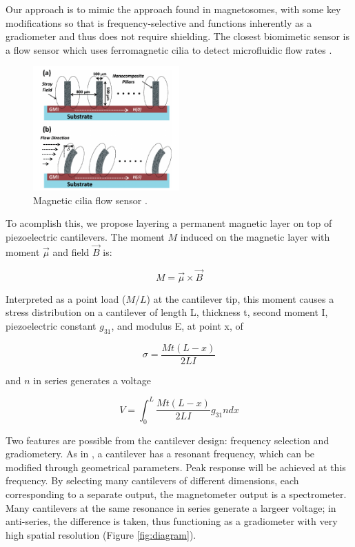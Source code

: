 Our approach is to mimic the approach found in magnetosomes, with some key modifications so that is frequency-selective and functions inherently as a gradiometer and thus does not require shielding. The closest biomimetic sensor is a flow sensor which uses ferromagnetic cilia to detect microfluidic flow rates \cite{alfadhel2014magnetic}.

\begin{figure}[h]
\centering
\includegraphics[width=0.5\textwidth]{cilia}
\caption{Magnetic cilia flow sensor \cite{alfadhel2014magnetic}.}
\label{fig:cilia}
\end{figure}

To acomplish this, we propose layering a permanent magnetic layer on top of piezoelectric cantilevers. The moment $M$ induced on the magnetic layer with moment $\vec{\mu}$ and field $\vec{B}$ is:


$$  M=\vec{\mu} \times \vec{B} $$

Interpreted as a point load ($M/L$) at the cantilever tip, this moment causes a stress distribution on a cantilever of length L, thickness t, second moment I, piezoelectric constant $g_{31}$, and modulus E, at point x, of

$$ \sigma=\frac{Mt(L-x)}{2LI} $$

and $n$ in series generates a voltage

$$ V=\int_0^L\frac{Mt(L-x)}{2LI}g_{31}ndx $$

 Two features are possible from the cantilever design: frequency selection and gradiometery. As in \cite{shen2008design}, a cantilever has a resonant frequency, which can be modified through geometrical parameters. Peak response will be achieved at this frequency. By selecting many cantilevers of different dimensions, each corresponding to a separate output, the magnetometer output is a spectrometer. Many cantilevers at the same resonance in series generate a largeer voltage; in anti-series, the difference is taken, thus functioning as a gradiometer with very high spatial resolution (Figure \ref{fig:diagram}). 

